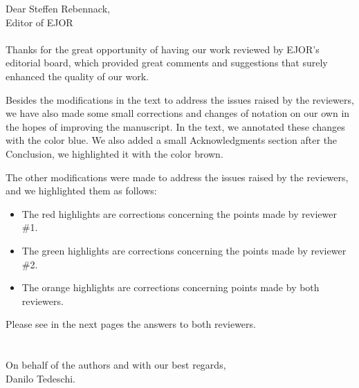 \documentclass{report}
\begin{document}
	
			
			\noindent Dear Steffen Rebennack,\\ Editor of EJOR
			\\
			\\
			
			Thanks for the great opportunity of having our work reviewed by EJOR's editorial board, which provided great comments and suggestions that surely enhanced the quality of our work. 
			
			Besides the modifications in the text to address the issues raised by the reviewers, we have also made some small corrections and changes of notation on our own in the hopes of improving the manuscript. In the text, we annotated these changes with the color {\color{blue}blue}.
			We also added a small Acknowledgments section after the Conclusion, we highlighted it with the color {\color{Brown} brown}.
			
			The other modifications were made to address the issues raised by the reviewers, and we highlighted them as follows:
			
			\begin{itemize}
				\item The {\color{Red} red} highlights are corrections concerning the points made by reviewer \#1.
				
				\item The {\color{Green} green} highlights are corrections concerning the points made by reviewer \#2.
				
				\item The {\color{Orange} orange} highlights are corrections concerning points made by both reviewers.
				
			\end{itemize}
			
			Please see in the next pages the answers to both reviewers.
			\\
			\\
			\\
			On behalf of the authors and with our best regards,\\
			Danilo Tedeschi.
\clearpage
	
	
	\clearpage
	
	
\end{document}
